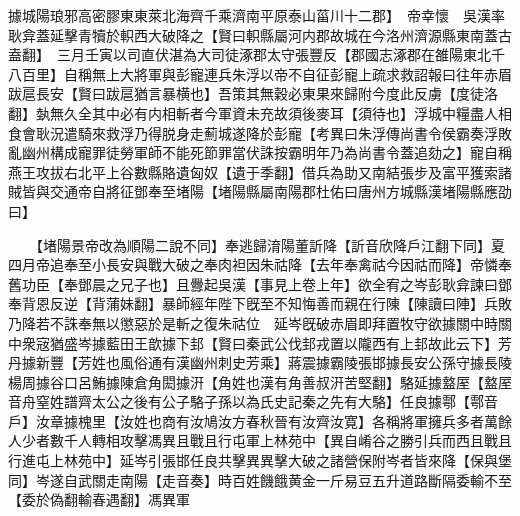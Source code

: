 據城陽琅邪高密膠東東萊北海齊千乘濟南平原泰山菑川十二郡】　帝幸懷　吳漢率耿弇蓋延擊青犢於軹西大破降之【賢曰軹縣屬河内郡故城在今洛州濟源縣東南蓋古盍翻】　三月壬寅以司直伏湛為大司徒涿郡太守張豐反【郡國志涿郡在雒陽東北千八百里】自稱無上大將軍與彭寵連兵朱浮以帝不自征彭寵上疏求救詔報曰往年赤眉跋扈長安【賢曰跋扈猶言暴横也】吾策其無穀必東果來歸附今度此反虜【度徒洛翻】埶無久全其中必有内相斬者今軍資未充故須後麥耳【須待也】浮城中糧盡人相食會耿況遣騎來救浮乃得脱身走薊城遂降於彭寵【考異曰朱浮傳尚書令侯霸奏浮敗亂幽州構成寵罪徒勞軍師不能死節罪當伏誅按霸明年乃為尚書令蓋追劾之】寵自稱燕王攻拔右北平上谷數縣賂遺匈奴【遺于季翻】借兵為助又南結張步及富平獲索諸賊皆與交通帝自將征鄧奉至堵陽【堵陽縣屬南陽郡杜佑曰唐州方城縣漢堵陽縣應劭曰】

　　【堵陽景帝改為順陽二說不同】奉逃歸淯陽董訢降【訢音欣降戶江翻下同】夏四月帝追奉至小長安與戰大破之奉肉袒因朱祜降【去年奉禽祜今因祜而降】帝憐奉舊功臣【奉鄧晨之兄子也】且釁起吳漢【事見上卷上年】欲全宥之岑彭耿弇諫曰鄧奉背恩反逆【背蒲妹翻】暴師經年陛下旣至不知悔善而親在行陳【陳讀曰陣】兵敗乃降若不誅奉無以懲惡於是斬之復朱祜位　延岑旣破赤眉即拜置牧守欲據關中時關中衆宼猶盛岑據藍田王歆據下邽【賢曰秦武公伐邽戎置以隴西有上邽故此云下】芳丹據新豐【芳姓也風俗通有漢幽州刺史芳乘】蔣震據霸陵張邯據長安公孫守據長陵楊周據谷口呂鮪據陳倉角閎據汧【角姓也漢有角善叔汧苦堅翻】駱延據盩厔【盩厔音舟窒姓譜齊太公之後有公子駱子孫以為氏史記秦之先有大駱】任良據鄠【鄠音戶】汝章據槐里【汝姓也商有汝鳩汝方春秋晉有汝齊汝寛】各稱將軍擁兵多者萬餘人少者數千人轉相攻擊馮異且戰且行屯軍上林苑中【異自崤谷之勝引兵而西且戰且行進屯上林苑中】延岑引張邯任良共擊異異擊大破之諸營保附岑者皆來降【保與堡同】岑遂自武關走南陽【走音奏】時百姓饑餓黄金一斤易豆五升道路斷隔委輸不至【委於偽翻輸春遇翻】馮異軍

